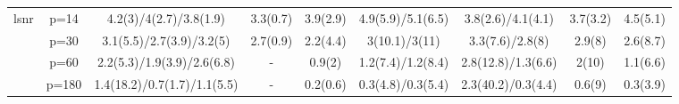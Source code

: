 \begin{table}[ht]
{\begin{tabular}{|c|c|ccccccc|}
  \midrule\multirow{4}[2]{*}{lsnr} & p=14 & 4.2(3)/4(2.7)/3.8(1.9) & 3.3(0.7) & 3.9(2.9) & 4.9(5.9)/5.1(6.5) & 3.8(2.6)/4.1(4.1) & 3.7(3.2) & 4.5(5.1) \\ 
   & p=30 & 3.1(5.5)/2.7(3.9)/3.2(5) & 2.7(0.9) & 2.2(4.4) & 3(10.1)/3(11) & 3.3(7.6)/2.8(8) & 2.9(8) & 2.6(8.7) \\ 
   & p=60 & 2.2(5.3)/1.9(3.9)/2.6(6.8) & - & 0.9(2) & 1.2(7.4)/1.2(8.4) & 2.8(12.8)/1.3(6.6) & 2(10) & 1.1(6.6) \\ 
   & p=180 & 1.4(18.2)/0.7(1.7)/1.1(5.5) & - & 0.2(0.6) & 0.3(4.8)/0.3(5.4) & 2.3(40.2)/0.3(4.4) & 0.6(9) & 0.3(3.9) \\ 
   \bottomrule 
\end{tabular}
}
\end{table}

